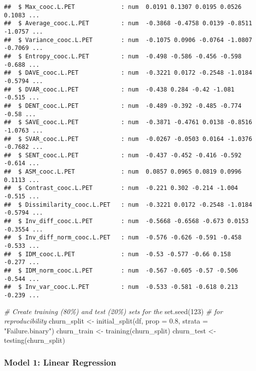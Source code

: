 \documentclass[
]{article}
\newenvironment{Shaded}{\begin{snugshade}}{\end{snugshade}}
\newcommand{\AttributeTok}[1]{\textcolor[rgb]{0.77,0.63,0.00}{#1}}
\newcommand{\CommentTok}[1]{\textcolor[rgb]{0.56,0.35,0.01}{\textit{#1}}}
\newcommand{\DecValTok}[1]{\textcolor[rgb]{0.00,0.00,0.81}{#1}}
\newcommand{\FloatTok}[1]{\textcolor[rgb]{0.00,0.00,0.81}{#1}}
\newcommand{\FunctionTok}[1]{\textcolor[rgb]{0.00,0.00,0.00}{#1}}
\newcommand{\NormalTok}[1]{#1}
\newcommand{\OtherTok}[1]{\textcolor[rgb]{0.56,0.35,0.01}{#1}}
\newcommand{\StringTok}[1]{\textcolor[rgb]{0.31,0.60,0.02}{#1}}
\begin{document}
\begin{verbatim}
##  $ Max_cooc.L.PET             : num  0.0191 0.1307 0.0195 0.0526 0.1083 ...
##  $ Average_cooc.L.PET         : num  -0.3868 -0.4758 0.0139 -0.8511 -1.0757 ...
##  $ Variance_cooc.L.PET        : num  -0.1075 0.0906 -0.0764 -1.0807 -0.7069 ...
##  $ Entropy_cooc.L.PET         : num  -0.498 -0.586 -0.456 -0.598 -0.688 ...
##  $ DAVE_cooc.L.PET            : num  -0.3221 0.0172 -0.2548 -1.0184 -0.5794 ...
##  $ DVAR_cooc.L.PET            : num  -0.438 0.284 -0.42 -1.081 -0.515 ...
##  $ DENT_cooc.L.PET            : num  -0.489 -0.392 -0.485 -0.774 -0.58 ...
##  $ SAVE_cooc.L.PET            : num  -0.3871 -0.4761 0.0138 -0.8516 -1.0763 ...
##  $ SVAR_cooc.L.PET            : num  -0.0267 -0.0503 0.0164 -1.0376 -0.7682 ...
##  $ SENT_cooc.L.PET            : num  -0.437 -0.452 -0.416 -0.592 -0.614 ...
##  $ ASM_cooc.L.PET             : num  0.0857 0.0965 0.0819 0.0996 0.1113 ...
##  $ Contrast_cooc.L.PET        : num  -0.221 0.302 -0.214 -1.004 -0.515 ...
##  $ Dissimilarity_cooc.L.PET   : num  -0.3221 0.0172 -0.2548 -1.0184 -0.5794 ...
##  $ Inv_diff_cooc.L.PET        : num  -0.5668 -0.6568 -0.673 0.0153 -0.3554 ...
##  $ Inv_diff_norm_cooc.L.PET   : num  -0.576 -0.626 -0.591 -0.458 -0.533 ...
##  $ IDM_cooc.L.PET             : num  -0.53 -0.577 -0.66 0.158 -0.277 ...
##  $ IDM_norm_cooc.L.PET        : num  -0.567 -0.605 -0.57 -0.506 -0.544 ...
##  $ Inv_var_cooc.L.PET         : num  -0.533 -0.581 -0.618 0.213 -0.239 ...
\end{verbatim}

\begin{Shaded}
\begin{Highlighting}[]
\CommentTok{\# Create training (80\%) and test (20\%) sets for the }
\FunctionTok{set.seed}\NormalTok{(}\DecValTok{123}\NormalTok{)  }\CommentTok{\# for reproducibility}
\NormalTok{churn\_split }\OtherTok{\textless{}{-}} \FunctionTok{initial\_split}\NormalTok{(df, }\AttributeTok{prop =} \FloatTok{0.8}\NormalTok{, }\AttributeTok{strata =} \StringTok{"Failure.binary"}\NormalTok{)}
\NormalTok{churn\_train }\OtherTok{\textless{}{-}} \FunctionTok{training}\NormalTok{(churn\_split)}
\NormalTok{churn\_test  }\OtherTok{\textless{}{-}} \FunctionTok{testing}\NormalTok{(churn\_split)}
\end{Highlighting}
\end{Shaded}

\hypertarget{model-1-linear-regression}{%
\subsubsection{Model 1: Linear
Regression}\label{model-1-linear-regression}}
\end{document}
